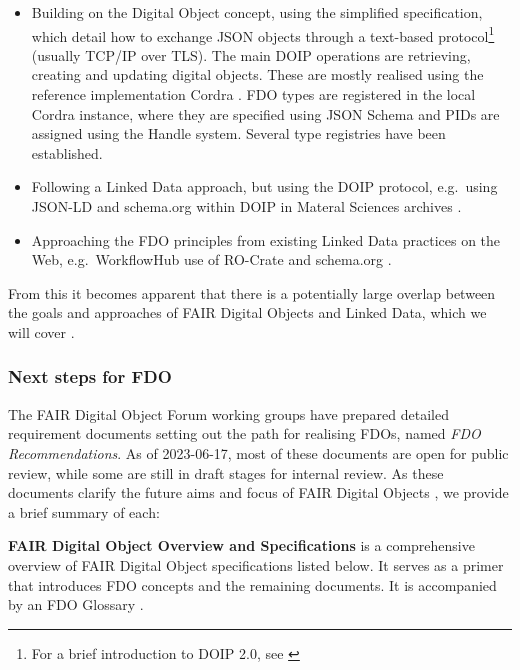 \documentclass[fleqn,10pt,lineno]{wlpeerjlua}
\providecommand{\tightlist}{%
  \setlength{\itemsep}{0pt}\setlength{\parskip}{0pt}}
\begin{document}
\begin{itemize}
\tightlist
\item
  Building on the Digital Object concept, using the simplified \textcite{foundationDigitalObjectInterface} specification, which detail how to exchange JSON objects through a text-based protocol\footnote{For a brief introduction to DOIP 2.0, see \textcite{DOIPExamplesCordraa}} (usually TCP/IP over TLS). The main DOIP operations are retrieving, creating and updating digital objects. These are mostly realised using the reference implementation Cordra \autocite{tupelo-schneckrobertBriefIntroductionCordra2022}. FDO types are registered in the local Cordra instance, where they are specified using JSON Schema \autocite{Draftbhuttonjsonschema} and PIDs are assigned using the Handle system. Several type registries have been established.
\item
  Following a Linked Data approach, but using the DOIP protocol, e.g.~using JSON-LD and schema.org within DOIP in Materal Sciences archives \autocite{10.1002/jcc.26842}.
\item
  Approaching the FDO principles from existing Linked Data practices on the Web, e.g.~WorkflowHub use of RO-Crate and schema.org \autocite{10.3897/rio.8.e93937}.
\end{itemize}

From this it becomes apparent that there is a potentially large overlap between the goals and approaches of FAIR Digital Objects and Linked Data, which we will cover .


\subsubsection*{Next steps for FDO}\label{sec:next-step-fdo}

The FAIR Digital Object Forum \autocite{FAIRDigitalObjects} working groups have prepared detailed requirement documents \autocite{fdo-Specs} setting out the path for realising FDOs, named \emph{FDO Recommendations}. As of 2023-06-17, most of these documents are open for public review, while some are still in draft stages for internal review. As these documents clarify the future aims and focus of FAIR Digital Objects \autocite{fdo-Roadmap}, we provide a brief summary of each:

\textbf{FAIR Digital Object Overview and Specifications} \autocite{fdo-Overview} is a comprehensive overview of FAIR Digital Object specifications listed below. It serves as a primer that introduces FDO concepts and the remaining documents. It is accompanied by an FDO Glossary \autocite{fdo-Glossary}.
\end{document}
